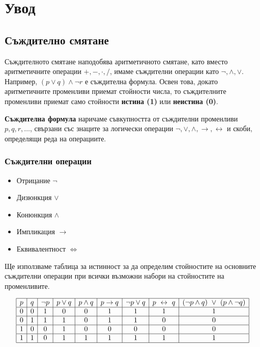 \chapter{Увод}

\section{Съждително смятане}
\label{sect:propositional}

Съждителното смятане наподобява аритметичното смятане, като вместо аритметичните операции $+,-,\cdot,/$, 
имаме съждителни операции като $\neg, \wedge, \vee$.
Например, $(p\vee q) \wedge \neg  r$ е съждителна формула.
Освен това, докато аритметичните променливи приемат стойности числа, то
съждителните променливи приемат само стойности {\bf истина (1)} или {\bf неистина (0)}.

{\bf Съждителна формула} наричаме съвкупността от съждителни променливи $p,q,r,\dots$, свързани със знаците за логически операции
$\neg, \vee, \wedge, \rightarrow, \leftrightarrow$ и скоби, определящи реда на операциите.

\subsection*{Съждителни операции}

\begin{itemize}
\item
  Отрицание $\neg$
\item 
  Дизюнкция $\vee$
\item
  Конюнкция $\wedge$
\item
  Импликация $\rightarrow$
\item
  Еквивалентност $\iff$
\end{itemize}

Ще използваме таблица за истинност за да определим стойностите на основните съждителни операции
при всички възможни набори на стойностите на променливите.

\[
\begin{array}{|c|c|c|c|c|c|c|c|c|}
  \hline
  p & q & \neg p & p \vee q & p \wedge q & p \rightarrow q & \neg p \vee q & p \iff q & (\neg{p}\wedge q)\ \vee\ (p\wedge \neg q) \\
  \hline
  0 & 0 & 1 & 0 & 0 & 1 & 1 & 1 & 1\\
  \hline
  0 & 1 & 1 & 1 & 0 & 1 & 1 & 0 & 0\\
  \hline
  1 & 0 & 0 & 1 & 0 & 0 & 0 & 0 & 0\\
  \hline
  1 & 1 & 0 & 1 & 1 & 1 & 1 & 1 & 1\\
  \hline
\end{array}
\]


